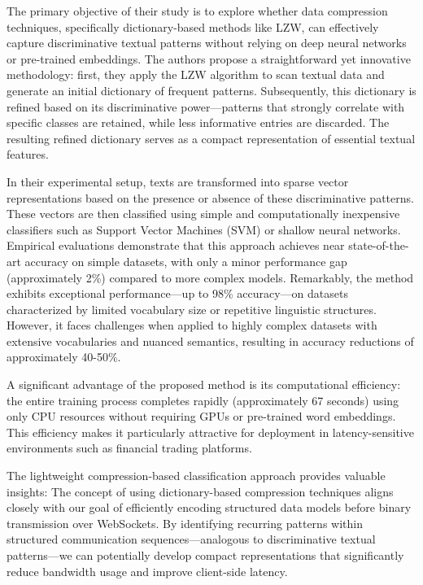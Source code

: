 \documentclass[a4paper, 11pt, twoside, openright]{report}
\begin{document}
The primary objective of their study is to explore whether data compression techniques, specifically dictionary-based methods like LZW, can effectively capture discriminative textual patterns without relying on deep neural networks or pre-trained embeddings. The authors propose a straightforward yet innovative methodology: first, they apply the LZW algorithm to scan textual data and generate an initial dictionary of frequent patterns. Subsequently, this dictionary is refined based on its discriminative power—patterns that strongly correlate with specific classes are retained, while less informative entries are discarded. The resulting refined dictionary serves as a compact representation of essential textual features.

In their experimental setup, texts are transformed into sparse vector representations based on the presence or absence of these discriminative patterns. These vectors are then classified using simple and computationally inexpensive classifiers such as Support Vector Machines (SVM) or shallow neural networks. Empirical evaluations demonstrate that this approach achieves near state-of-the-art accuracy on simple datasets, with only a minor performance gap (approximately 2\%) compared to more complex models. Remarkably, the method exhibits exceptional performance—up to 98\% accuracy—on datasets characterized by limited vocabulary size or repetitive linguistic structures. However, it faces challenges when applied to highly complex datasets with extensive vocabularies and nuanced semantics, resulting in accuracy reductions of approximately 40-50\%.

A significant advantage of the proposed method is its computational efficiency: the entire training process completes rapidly (approximately 67 seconds) using only CPU resources without requiring GPUs or pre-trained word embeddings. This efficiency makes it particularly attractive for deployment in latency-sensitive environments such as financial trading platforms.

The lightweight compression-based classification approach provides valuable insights: The concept of using dictionary-based compression techniques aligns closely with our goal of efficiently encoding structured data models before binary transmission over WebSockets. By identifying recurring patterns within structured communication sequences—analogous to discriminative textual patterns—we can potentially develop compact representations that significantly reduce bandwidth usage and improve client-side latency.
\end{document}
